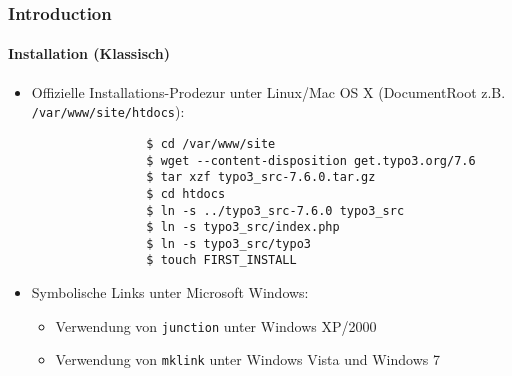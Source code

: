 \begin{frame}[fragile]
	\frametitle{Introduction}
	\framesubtitle{Installation (Klassisch)}

	\begin{itemize}
		\item Offizielle Installations-Prodezur unter Linux/Mac OS X\newline
			(DocumentRoot z.B. \texttt{/var/www/site/htdocs}):

			\begin{lstlisting}
				$ cd /var/www/site
				$ wget --content-disposition get.typo3.org/7.6
				$ tar xzf typo3_src-7.6.0.tar.gz
				$ cd htdocs
				$ ln -s ../typo3_src-7.6.0 typo3_src
				$ ln -s typo3_src/index.php
				$ ln -s typo3_src/typo3
				$ touch FIRST_INSTALL
			\end{lstlisting}

		\item Symbolische Links unter Microsoft Windows:

			\begin{itemize}
				\item Verwendung von \texttt{junction} unter Windows XP/2000
				\item Verwendung von \texttt{mklink} unter Windows Vista und Windows 7
			\end{itemize}

	\end{itemize}
\end{frame}

